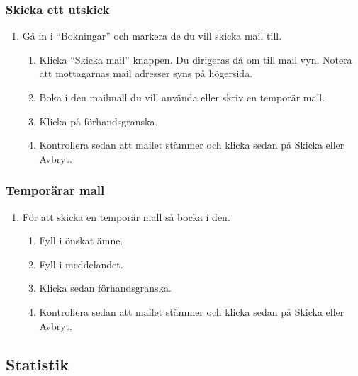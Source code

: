 \documentclass[a4paper, twoside, 11pt, titlepage]{article}
\begin{document}
		\subsubsection{Skicka ett utskick}


		\begin{enumerate}
		\item Gå in i ``Bokningar'' och markera de du vill skicka mail till.

		\begin{enumerate}
		\item Klicka ``Skicka mail'' knappen. Du dirigeras då om till mail vyn. Notera att mottagarnas mail adresser syns på högersida.

		\item Boka i den mailmall du vill använda eller skriv en temporär mall.

		\item Klicka på förhandsgranska.

		\item Kontrollera sedan att mailet stämmer och klicka sedan på Skicka eller Avbryt.
		\end{enumerate}
		\end{enumerate}

		\subsubsection{Temporärar mall}


		\begin{enumerate}
		\item För att skicka en temporär mall så bocka i den.

		\begin{enumerate}
		\item Fyll i önskat ämne.

		\item Fyll i meddelandet.

		\item Klicka sedan förhandsgranska.

		\item Kontrollera sedan att mailet stämmer och klicka sedan på Skicka eller Avbryt.
		\end{enumerate}
		\end{enumerate}

	\subsection{Statistik}
\end{document}
